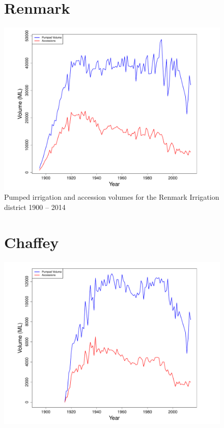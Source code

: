 \documentclass[a4paper, titlepage, 12pt]{article}\usepackage[]{graphicx}\usepackage[]{color}
\makeatletter
\def\maxwidth{ %
  \ifdim\Gin@nat@width>\linewidth
    \linewidth
  \else
    \Gin@nat@width
  \fi
}
\newenvironment{knitrout}{}{} %
\makeatother
\begin{document}
\begin{sffamily}
\begin{appendices}
\begin{figure}
\section{Renmark}
\begin{knitrout}
\color{fgcolor}
\includegraphics[width=\maxwidth]{../figures/Renmark-1} 

\end{knitrout}
\caption{Pumped irrigation and accession volumes for the Renmark Irrigation district 1900 -- 2014}
\label{fig06}
\end{figure}

\begin{figure}
\section{Chaffey}
\begin{knitrout}
\color{fgcolor}
\includegraphics[width=\maxwidth]{../figures/Chaffey-1} 


\end{knitrout}
\end{figure}
\end{appendices}
\end{sffamily}
\end{document}
